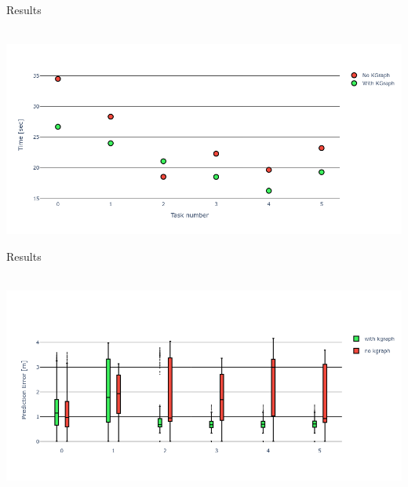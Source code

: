 \begin{frame}[fragile]{Results} 
\begin{center}
  \hbox{\hspace{-0.7cm} \includegraphics[width=1.1\textwidth]{figures/results/random_push_time_vs}}
\end{center}
\end{frame}



\begin{frame}[fragile]{Results} 
\begin{center}
  \hbox{\hspace{-0.05\textwidth} \includegraphics[width=1.1\textwidth]{figures/results/random_push_pe_vs}}
\end{center}
\end{frame}



